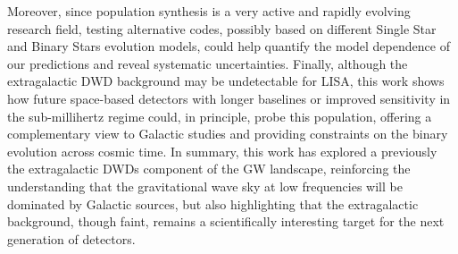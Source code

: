 Moreover, since population synthesis is a very active and rapidly evolving research field, testing alternative codes, possibly based on different Single Star and Binary Stars evolution models, could help quantify the model dependence of our predictions and reveal systematic uncertainties.
Finally, although the extragalactic DWD background may be undetectable for LISA, this work shows how future space-based detectors with longer baselines or improved sensitivity in the sub-millihertz regime could, in principle, probe this population, offering a complementary view to Galactic studies and providing constraints on the binary evolution across cosmic time.
In summary, this work has explored a previously the extragalactic DWDs component of the GW landscape, reinforcing the understanding that the gravitational wave sky at low frequencies will be dominated by Galactic sources, but also highlighting that the extragalactic background, though faint, remains a scientifically interesting target for the next generation of detectors.

